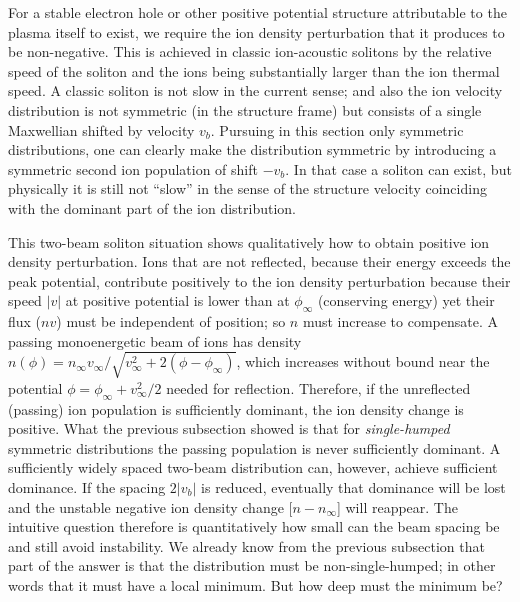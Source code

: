 \documentclass[pre]{revtex4-2}
\begin{document}
For a stable electron hole or other positive potential
structure attributable to the plasma itself to exist, we require the
ion density perturbation that it produces to be non-negative. This is
achieved in classic ion-acoustic solitons by the relative speed of the
soliton and the ions being substantially larger than the ion thermal
speed. A classic soliton is not slow in the current
sense; and also the
ion velocity distribution is not symmetric (in the structure frame)
but consists of a single Maxwellian shifted by velocity
$v_b$. Pursuing in this section only symmetric distributions, one can
clearly make the distribution symmetric by introducing a symmetric
second ion population of shift $-v_b$.  In that case a soliton can
exist, but physically it is still not ``slow'' in the sense of the
structure velocity coinciding with the dominant part of the ion
distribution.

This two-beam soliton situation shows qualitatively how to obtain positive ion
density perturbation. Ions that are not reflected, because their
energy exceeds the peak potential, contribute positively to the ion
density perturbation because their speed $|v|$ at positive potential
is lower than at $\phi_\infty$ (conserving energy) yet their flux
($nv$) must be independent of position; so $n$ must increase to
compensate. A passing monoenergetic beam of ions has density $n(\phi)=n_\infty
v_\infty/\sqrt{v_\infty^2+2(\phi-\phi_\infty)}$, which increases
without bound near the potential $\phi=\phi_\infty+v_\infty^2/2$
needed for reflection. Therefore, if the unreflected (passing) ion population is
sufficiently dominant, the ion density change is positive. What the
previous subsection showed is that for \emph{single-humped} symmetric
distributions the passing population is never sufficiently
dominant. A sufficiently widely spaced two-beam distribution can, however,
achieve sufficient dominance. If the spacing $2|v_b|$ is reduced,
eventually that dominance will be lost and the unstable negative
ion density change [$n-n_\infty$] will reappear. The intuitive question
therefore is quantitatively how small can the beam spacing be and
still avoid instability. We already know from the previous subsection
that part of the answer is that the distribution must be
non-single-humped; in other words that it must have a local minimum. But
how deep must the minimum be?
\end{document}
